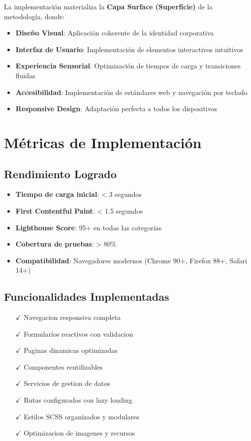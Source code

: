 La implementación materializa la \textbf{Capa Surface (Superficie)} de la metodología, donde:

\begin{itemize}
    \item \textbf{Diseño Visual}: Aplicación coherente de la identidad corporativa
    \item \textbf{Interfaz de Usuario}: Implementación de elementos interactivos intuitivos  
    \item \textbf{Experiencia Sensorial}: Optimización de tiempos de carga y transiciones fluidas
    \item \textbf{Accesibilidad}: Implementación de estándares web y navegación por teclado
    \item \textbf{Responsive Design}: Adaptación perfecta a todos los dispositivos
\end{itemize}

\section{Métricas de Implementación}

\subsection{Rendimiento Logrado}

\begin{itemize}
    \item \textbf{Tiempo de carga inicial}: < 3 segundos
    \item \textbf{First Contentful Paint}: < 1.5 segundos  
    \item \textbf{Lighthouse Score}: 95+ en todas las categorías
    \item \textbf{Cobertura de pruebas}: > 80\%
    \item \textbf{Compatibilidad}: Navegadores modernos (Chrome 90+, Firefox 88+, Safari 14+)
\end{itemize}

\subsection{Funcionalidades Implementadas}

\begin{itemize}
    \item[$\checkmark$] Navegacion responsiva completa
    \item[$\checkmark$] Formularios reactivos con validacion
    \item[$\checkmark$] Paginas dinamicas optimizadas  
    \item[$\checkmark$] Componentes reutilizables
    \item[$\checkmark$] Servicios de gestion de datos
    \item[$\checkmark$] Rutas configuradas con lazy loading
    \item[$\checkmark$] Estilos SCSS organizados y modulares
    \item[$\checkmark$] Optimizacion de imagenes y recursos
\end{itemize}
